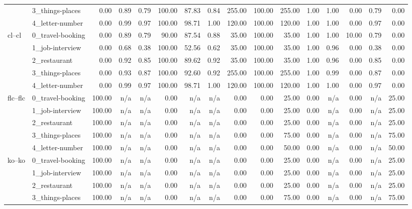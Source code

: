 \begin{tabular}{llrrrrrrrrrrrrrr}
 & 3_things-places & 0.00 & 0.89 & 0.79 & 100.00 & 87.83 & 0.84 & 255.00 & 100.00 & 255.00 & 1.00 & 1.00 & 0.00 & 0.79 & 0.00 \\
 & 4_letter-number & 0.00 & 0.99 & 0.97 & 100.00 & 98.71 & 1.00 & 120.00 & 100.00 & 120.00 & 1.00 & 1.00 & 0.00 & 0.97 & 0.00 \\
\cline{1-16}
\multirow[t]{5}{*}{cl--cl} & 0_travel-booking & 0.00 & 0.89 & 0.79 & 90.00 & 87.54 & 0.88 & 35.00 & 100.00 & 35.00 & 1.00 & 1.00 & 10.00 & 0.79 & 0.00 \\
 & 1_job-interview & 0.00 & 0.68 & 0.38 & 100.00 & 52.56 & 0.62 & 35.00 & 100.00 & 35.00 & 1.00 & 0.96 & 0.00 & 0.38 & 0.00 \\
 & 2_restaurant & 0.00 & 0.92 & 0.85 & 100.00 & 89.62 & 0.92 & 35.00 & 100.00 & 35.00 & 1.00 & 0.96 & 0.00 & 0.85 & 0.00 \\
 & 3_things-places & 0.00 & 0.93 & 0.87 & 100.00 & 92.60 & 0.92 & 255.00 & 100.00 & 255.00 & 1.00 & 0.99 & 0.00 & 0.87 & 0.00 \\
 & 4_letter-number & 0.00 & 0.99 & 0.97 & 100.00 & 98.71 & 1.00 & 120.00 & 100.00 & 120.00 & 1.00 & 1.00 & 0.00 & 0.97 & 0.00 \\
\cline{1-16}
\multirow[t]{5}{*}{flc--flc} & 0_travel-booking & 100.00 & n/a & n/a & 0.00 & n/a & n/a & 0.00 & 0.00 & 25.00 & 0.00 & n/a & 0.00 & n/a & 25.00 \\
 & 1_job-interview & 100.00 & n/a & n/a & 0.00 & n/a & n/a & 0.00 & 0.00 & 25.00 & 0.00 & n/a & 0.00 & n/a & 25.00 \\
 & 2_restaurant & 100.00 & n/a & n/a & 0.00 & n/a & n/a & 0.00 & 0.00 & 25.00 & 0.00 & n/a & 0.00 & n/a & 25.00 \\
 & 3_things-places & 100.00 & n/a & n/a & 0.00 & n/a & n/a & 0.00 & 0.00 & 75.00 & 0.00 & n/a & 0.00 & n/a & 75.00 \\
 & 4_letter-number & 100.00 & n/a & n/a & 0.00 & n/a & n/a & 0.00 & 0.00 & 50.00 & 0.00 & n/a & 0.00 & n/a & 50.00 \\
\cline{1-16}
\multirow[t]{5}{*}{ko--ko} & 0_travel-booking & 100.00 & n/a & n/a & 0.00 & n/a & n/a & 0.00 & 0.00 & 25.00 & 0.00 & n/a & 0.00 & n/a & 25.00 \\
 & 1_job-interview & 100.00 & n/a & n/a & 0.00 & n/a & n/a & 0.00 & 0.00 & 25.00 & 0.00 & n/a & 0.00 & n/a & 25.00 \\
 & 2_restaurant & 100.00 & n/a & n/a & 0.00 & n/a & n/a & 0.00 & 0.00 & 25.00 & 0.00 & n/a & 0.00 & n/a & 25.00 \\
 & 3_things-places & 100.00 & n/a & n/a & 0.00 & n/a & n/a & 0.00 & 0.00 & 75.00 & 0.00 & n/a & 0.00 & n/a & 75.00 \\

\end{tabular}

